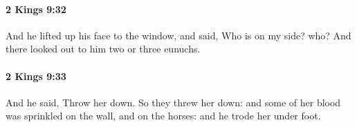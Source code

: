 		\paragraph{2 Kings 9:32} %
			\label{2KINGS-9-32}

			And he lifted up his face to the window, and said, Who is on my side? who? And there looked out to him two or three eunuchs.


		\paragraph{2 Kings 9:33} %
			\label{2KINGS-9-33}

			And he said, Throw her down. So they threw her down: and some of her blood was sprinkled on the wall, and on the horses: and he trode her under foot.


